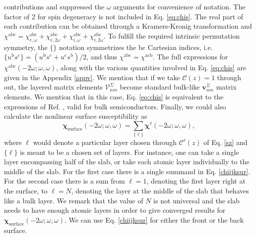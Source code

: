 contributions and suppressed the $\omega$ arguments for convenience of notation.
The factor of 2 for spin degeneracy is not included in Eq. \eqref{eq:chis}. The
real part of each contribution can be obtained through a Kramers-Kronig
transformation\cite{nicolasPRB14} and $\chi^{\mathrm{a}\mathrm{b}\mathrm{c}}=
\chi^{\mathrm{a}\mathrm{b}\mathrm{c}}_{e,\omega} 
+\chi^{\mathrm{a}\mathrm{b}\mathrm{c}}_{e,2\omega}
+\chi^{\mathrm{a}\mathrm{b}\mathrm{c}}_{i,\omega} 
+\chi^{\mathrm{a}\mathrm{b}\mathrm{c}}_{i,2\omega}
$.
To fulfill the required intrinsic permutation symmetry, the $\{\}$ notation
symmetrizes the $\mathrm{b}\mathrm{c}$ Cartesian indices, i.e. $\{u^{\mathrm{b}}
s^{\mathrm{c}}\}=(u^{\mathrm{b}}s^{\mathrm{c}}+u^{\mathrm{c}}s^{\mathrm{b}})/2$,
and thus $\chi^{\mathrm{a}\mathrm{b}\mathrm{c}}=\chi^{\mathrm{acb}}$. The full
expressions for $\chi^{\mathrm{a}\mathrm{b}\mathrm{c}}(-2\omega;\omega,\omega)$,
along with the various quantities involved in Eq. \eqref{eq:chis} are given in
the Appendix \ref{appv}. We mention that if we take
$\boldsymbol{\mathcal{C}}(z)=1$ through out, the layered matrix elements
$\boldsymbol{\mathcal{V}}^{\Sigma}_{nm}$ become standard bulk-like
$\mathbf{v}^{\Sigma}_{nm}$ matrix elements. We mention that in this case, Eq.
\eqref{eq:chis} is equivalent to the expressions of Ref. \cite{cabellosPRB09},
valid for bulk semiconductors. Finally, we could also calculate the nonlinear
surface susceptibility as
\begin{equation}
\boldsymbol{\chi}_{\mathrm{surface}}(-2\omega;\omega,\omega)
= \sum_{\{\ell\}}\boldsymbol{\chi}^\ell(-2\omega;\omega,\omega),
\label{chiijksur}
\end{equation} 
where $\ell$ would denote a particular layer chosen through
$\boldsymbol{\mathcal{C}}^\ell(z)$ of Eq. \eqref{sz} and $\{\ell\}$ is meant to
be a chosen set of layers. For instance, one can take a single layer
encompassing half of the slab, or take each atomic layer individually to the
middle of the slab. For the first case there is a single summand in Eq.
\eqref{chiijksur}. For the second case there is a sum from $\ell=1$, denoting
the first layer right at the surface, to $\ell=N$, denoting the layer at the
middle of the slab that behaves like a bulk layer. We remark that the value of
$N$ is not universal and the slab needs to have enough atomic layers in order to
give converged results for
$\boldsymbol{\chi}_{\mathrm{surface}}(-2\omega;\omega,\omega)$. We can use Eq.
\eqref{chiijksur} for either the front or the back surface.

